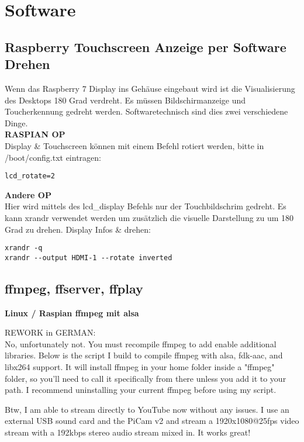\newpage
\section{Software}

\subsection{Raspberry Touchscreen Anzeige per Software Drehen}
Wenn das Raspberry 7\grqq{} Display ins Gehäuse eingebaut wird ist die 
Visualisierung des Desktops 180 Grad verdreht. Es müssen Bildschirmanzeige 
und Toucherkennung gedreht werden. Softwaretechnisch sind dies zwei verschiedene 
Dinge.\\

\textbf{RASPIAN OP}\\
Display \& Touchscreen können mit einem Befehl rotiert werden, 
bitte in /boot/config.txt eintragen:
\begin{verbatim}lcd_rotate=2\end{verbatim}

\textbf{Andere OP}\\
Hier wird mittels des lcd\_display Befehls nur der Touchbildschrim 
gedreht. Es kann xrandr verwendet werden um zusätzlich die visuelle Darstellung zu 
um 180 Grad zu drehen. Display Infos \& drehen:
\begin{verbatim}
xrandr -q
xrandr --output HDMI-1 --rotate inverted
\end{verbatim}


\subsection{ffmpeg, ffserver, ffplay}

\textbf{Linux / Raspian ffmpeg mit alsa} %
   
REWORK in GERMAN:\\
No, unfortunately not. You must recompile ffmpeg to add enable additional libraries. Below is the script I build to compile ffmpeg with alsa, fdk-aac, and libx264 support. It will install ffmpeg in your home folder inside a "ffmpeg" folder, so you'll need to call it specifically from there unless you add it to your path. I recommend uninstalling your current ffmpeg before using my script.

Btw, I am able to stream directly to YouTube now without any issues. I use an external USB sound card and the PiCam v2 and stream a 1920x1080@25fps video stream with a 192kbps stereo audio stream mixed in. It works great!


